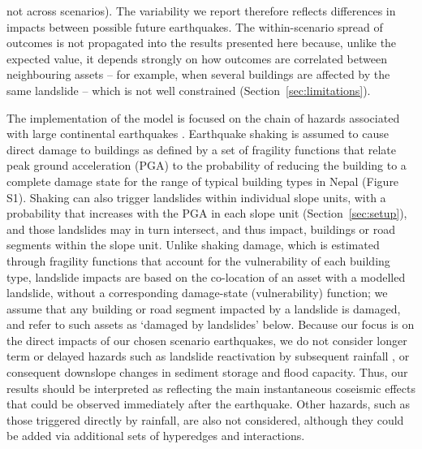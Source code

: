 \documentclass[preprint,12pt,authoryear]{elsarticle}
\begin{document}
not across scenarios). The variability we report therefore reflects differences in impacts between possible future earthquakes. The within-scenario spread of outcomes is not propagated into the results presented here because, unlike the expected value, it depends strongly on how outcomes are correlated between neighbouring assets -- for example, when several buildings are affected by the same landslide -- which is not well constrained (Section~\ref{sec:limitations}).

The implementation of the model is focused on the chain of hazards associated with large continental earthquakes \citep{Fan2019}. Earthquake shaking is assumed to cause direct damage to buildings as defined by a set of fragility functions that relate peak ground acceleration (PGA) to the probability of reducing the building to a complete damage state for the range of typical building types in Nepal (Figure S1). Shaking can also trigger landslides within individual slope units, with a probability that increases with the PGA in each slope unit (Section~\ref{sec:setup}), and those landslides may in turn intersect, and thus impact, buildings or road segments within the slope unit. Unlike shaking damage, which is estimated through fragility functions that account for the vulnerability of each building type, landslide impacts are based on the co-location of an asset with a modelled landslide, without a corresponding damage-state (vulnerability) function; we assume that any building or road segment impacted by a landslide is damaged, and refer to such assets as `damaged by landslides' below. Because our focus is on the direct impacts of our chosen scenario earthquakes, we do not consider longer term or delayed hazards such as landslide reactivation by subsequent rainfall \citep{Fan2019,Kincey2021}, or consequent downslope changes in sediment storage and flood capacity. Thus, our results should be interpreted as reflecting the main instantaneous coseismic effects that could be observed immediately after the earthquake. Other hazards, such as those triggered directly by rainfall, are also not considered, although they could be added via additional sets of hyperedges and interactions.
\end{document}
